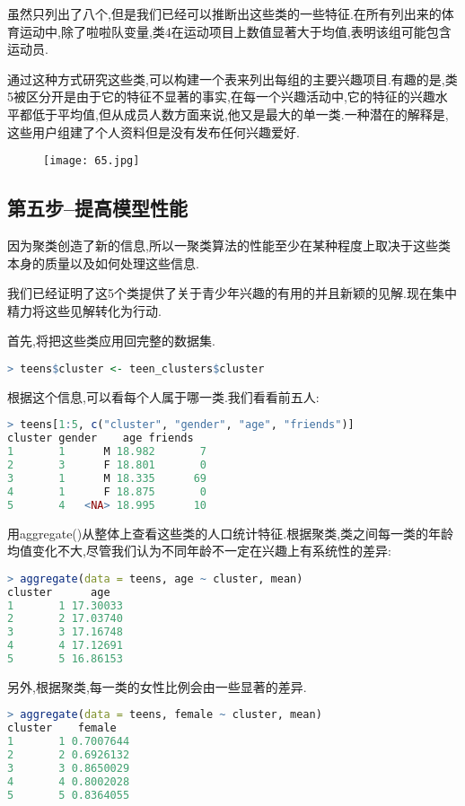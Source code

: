 \documentclass[11pt,a4paper,oneside]{book}
\begin{document}
虽然只列出了八个,但是我们已经可以推断出这些类的一些特征.在所有列出来的体育运动中,除了啦啦队变量,类4在运动项目上数值显著大于均值,表明该组可能包含运动员.

通过这种方式研究这些类,可以构建一个表来列出每组的主要兴趣项目.有趣的是,类5被区分开是由于它的特征不显著的事实,在每一个兴趣活动中,它的特征的兴趣水平都低于平均值,但从成员人数方面来说,他又是最大的单一类.一种潜在的解释是,这些用户组建了个人资料但是没有发布任何兴趣爱好.
\begin{figure}[H]
	\centering
	\texttt{[image: 65.jpg]}
\end{figure}

\subsection{第五步--提高模型性能}
因为聚类创造了新的信息,所以一聚类算法的性能至少在某种程度上取决于这些类本身的质量以及如何处理这些信息.

我们已经证明了这5个类提供了关于青少年兴趣的有用的并且新颖的见解.现在集中精力将这些见解转化为行动.

首先,将把这些类应用回完整的数据集.
\begin{lstlisting}[language=r]
> teens$cluster <- teen_clusters$cluster
\end{lstlisting}

根据这个信息,可以看每个人属于哪一类.我们看看前五人:
\begin{lstlisting}[language=r]
> teens[1:5, c("cluster", "gender", "age", "friends")]
cluster gender    age friends
1       1      M 18.982       7
2       3      F 18.801       0
3       1      M 18.335      69
4       1      F 18.875       0
5       4   <NA> 18.995      10
\end{lstlisting}

用aggregate()从整体上查看这些类的人口统计特征.根据聚类,类之间每一类的年龄均值变化不大,尽管我们认为不同年龄不一定在兴趣上有系统性的差异:
\begin{lstlisting}[language=r]
> aggregate(data = teens, age ~ cluster, mean)
cluster      age
1       1 17.30033
2       2 17.03740
3       3 17.16748
4       4 17.12691
5       5 16.86153
\end{lstlisting}

另外,根据聚类,每一类的女性比例会由一些显著的差异.
\begin{lstlisting}[language=r]
> aggregate(data = teens, female ~ cluster, mean)
cluster    female
1       1 0.7007644
2       2 0.6926132
3       3 0.8650029
4       4 0.8002028
5       5 0.8364055
\end{lstlisting}
\end{document}
